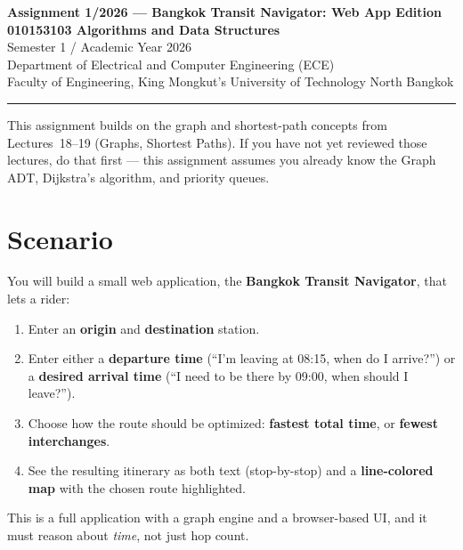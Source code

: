 \documentclass[11pt,a4paper]{article}
\begin{document}
\begin{center}
  {\Large\bfseries\color{kmutnbBlue}
    Assignment 1/2026 --- Bangkok Transit Navigator: Web App Edition}\\[4pt]
  {\large\bfseries 010153103 \quad Algorithms and Data Structures}\\[2pt]
  {\normalsize Semester 1 / Academic Year 2026}\\[2pt]
  {\small Department of Electrical and Computer Engineering (ECE)}\\
  {\small Faculty of Engineering,
    King Mongkut's University of Technology North Bangkok}
\end{center}

\noindent\rule{\linewidth}{0.4pt}\medskip

\noindent
This assignment builds on the graph and shortest-path concepts from
Lectures~18--19 (Graphs, Shortest Paths). If you have not yet reviewed
those lectures, do that first --- this assignment assumes you already know
the Graph ADT, Dijkstra's algorithm, and priority queues.

\section{Scenario}

You will build a small web application, the \textbf{Bangkok Transit
Navigator}, that lets a rider:

\begin{enumerate}
  \item Enter an \textbf{origin} and \textbf{destination} station.
  \item Enter either a \textbf{departure time} (``I'm leaving at 08:15,
        when do I arrive?'') or a \textbf{desired arrival time} (``I need
        to be there by 09:00, when should I leave?'').
  \item Choose how the route should be optimized: \textbf{fastest total
        time}, or \textbf{fewest interchanges}.
  \item See the resulting itinerary as both text (stop-by-stop) and a
        \textbf{line-colored map} with the chosen route highlighted.
\end{enumerate}

This is a full application with a graph engine and a browser-based UI, and
it must reason about \emph{time}, not just hop count.
\end{document}
